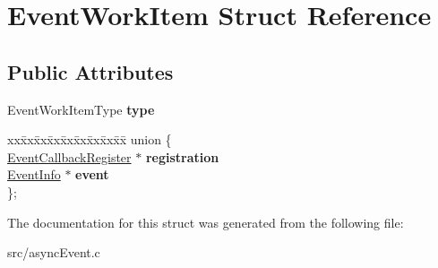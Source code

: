 \hypertarget{structEventWorkItem}{}\section{Event\+Work\+Item Struct Reference}
\label{structEventWorkItem}
\subsection*{Public Attributes}
\begin{DoxyCompactItemize}
\item 
\mbox{\label{structEventWorkItem_af4d1ac868adff74361951ef8ddbd9f86}} 
Event\+Work\+Item\+Type {\bfseries type}
\item 
\mbox{\label{structEventWorkItem_a78541915d81a81d332e378940aadab90}} 
\begin{tabbing}
xx\=xx\=xx\=xx\=xx\=xx\=xx\=xx\=xx\=\kill
union \{\\
\>\hyperlink{structEventCallbackRegister}{EventCallbackRegister} $\ast$ {\bfseries registration}\\
\>\hyperlink{structEventInfo}{EventInfo} $\ast$ {\bfseries event}\\
\}; \\

\end{tabbing}\end{DoxyCompactItemize}


The documentation for this struct was generated from the following file\+:\begin{DoxyCompactItemize}
\item 
src/async\+Event.\+c\end{DoxyCompactItemize}
